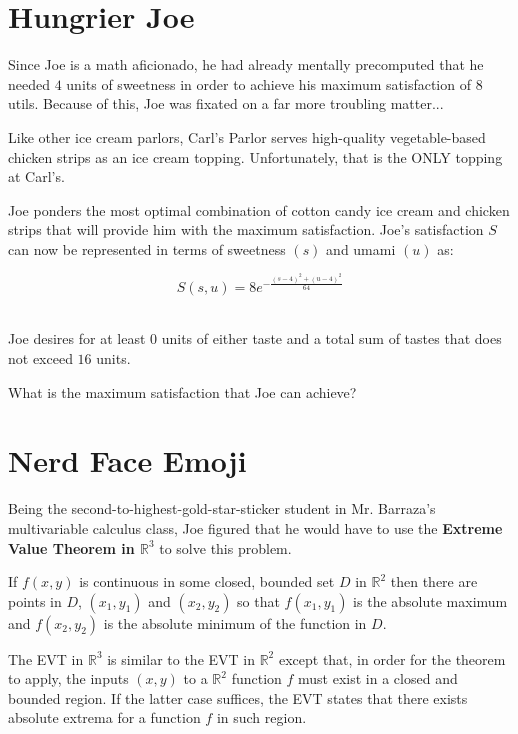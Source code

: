 \setcounter{chapter}{2}
\chapter{Hungrier Joe}
Since Joe is a math aficionado, he had already mentally precomputed that he needed $4$ units of sweetness in order to achieve his maximum satisfaction of $8$ utils.
Because of this, Joe was fixated on a far more troubling matter...

Like other ice cream parlors, Carl's Parlor serves high-quality vegetable-based chicken strips as an ice cream topping.
Unfortunately, that is the ONLY topping at Carl's.

Joe ponders the most optimal combination of cotton candy ice cream and chicken strips that will provide him with the maximum satisfaction.
Joe's satisfaction $S$ can now be represented in terms of sweetness $(s)$ and umami $(u)$ as:\par
\LARGE
\begin{equation}
	S(s, u) = 8e^{-\frac{(s-4)^2+(u-4)^2}{64}}
\end{equation}
\normalsize
\\
\begin{eg}
	Joe desires for at least $0$ units of either taste and a total sum of tastes that does not exceed $16$ units.

	What is the maximum satisfaction that Joe can achieve?
\end{eg}

\setcounter{chapter}{3}
\chapter{Nerd Face Emoji}
Being the second-to-highest-gold-star-sticker student in Mr. Barraza's multivariable calculus class, Joe figured that he would have to use the \textbf{Extreme Value Theorem in $\mathbb{R}^3$} to solve this problem.
\begin{theorem}
	If \(f\left( {x,y} \right)\) is continuous in some closed, bounded set \(D\) in \({\mathbb{R}^2}\) then there are points in \(D\), \(\left( {{x_1},{y_1}} \right)\) and \(\left( {{x_2},{y_2}} \right)\) so that \(f\left( {{x_1},{y_1}} \right)\) is the absolute maximum and \(f\left( {{x_2},{y_2}} \right)\) is the absolute minimum of the function in \(D\).
\end{theorem}
The EVT in $\mathbb{R}^3$ is similar to the EVT in $\mathbb{R}^2$ except that, in order for the theorem to apply, the inputs $(x, y)$ to a $\mathbb{R}^2$ function $f$ must exist in a closed and bounded region.
If the latter case suffices, the EVT states that there exists absolute extrema for a function $f$ in such region.

